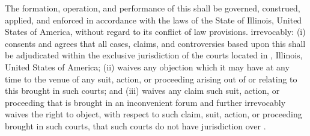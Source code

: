 The formation, operation, and performance of this \lease shall be governed, construed, applied, and enforced in accordance with the laws of the State of Illinois, United States of America, without regard to its conflict of law provisions. \lessee irrevocably: (i) consents and agrees that all cases, claims, and controversies based upon this \lease shall be adjudicated within the exclusive jurisdiction of the courts located in \governingCounty, Illinois, United States of America; (ii) waives any objection which it may have at any time to the venue of any suit, action, or proceeding arising out of or relating to this \lease brought in such courts; and (iii) waives any claim such suit, action, or proceeding that is brought in an inconvenient forum and further irrevocably waives the right to object, with respect to such claim, suit, action, or proceeding brought in such courts, that such courts do not have jurisdiction over \lessor.

